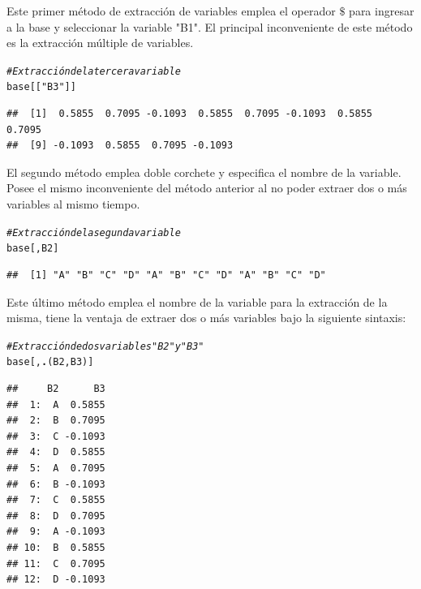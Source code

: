 \documentclass[11pt,a4paper,oneside]{book}\usepackage[]{graphicx}\usepackage[]{color}
\makeatletter
\newcommand{\hlstr}[1]{\textcolor[rgb]{0.192,0.494,0.8}{#1}}%
\newcommand{\hlcom}[1]{\textcolor[rgb]{0.678,0.584,0.686}{\textit{#1}}}%
\newcommand{\hlstd}[1]{\textcolor[rgb]{0.345,0.345,0.345}{#1}}%
\newcommand{\hlkwd}[1]{\textcolor[rgb]{0.737,0.353,0.396}{\textbf{#1}}}%
\newenvironment{kframe}{%
 \def\at@end@of@kframe{}%
 \ifinner\ifhmode%
  \def\at@end@of@kframe{\end{minipage}}%
  \begin{minipage}{\columnwidth}%
 \fi\fi%
 \def\FrameCommand##1{\hskip\@totalleftmargin \hskip-\fboxsep
 \colorbox{shadecolor}{##1}\hskip-\fboxsep
     \hskip-\linewidth \hskip-\@totalleftmargin \hskip\columnwidth}%
 \MakeFramed {\advance\hsize-\width
   \@totalleftmargin\z@ \linewidth\hsize
   \@setminipage}}%
 {\par\unskip\endMakeFramed%
 \at@end@of@kframe}
\newenvironment{knitrout}{}{} %
\makeatother
\begin{document}
\begin{itemize}
Este primer método de extracción de variables emplea el operador $\$$ para ingresar a la base y seleccionar la variable "B1". El principal inconveniente de este método es la extracción múltiple de variables.

\begin{knitrout}
\color{fgcolor}\begin{kframe}
\begin{alltt}
\hlcom{# Extracción de la tercera variable}
\hlstd{base[[}\hlstr{"B3"}\hlstd{]]}
\end{alltt}
\begin{verbatim}
##  [1]  0.5855  0.7095 -0.1093  0.5855  0.7095 -0.1093  0.5855  0.7095
##  [9] -0.1093  0.5855  0.7095 -0.1093
\end{verbatim}
\end{kframe}
\end{knitrout}

El segundo método emplea doble corchete y especifica el nombre de la variable. Posee el mismo inconveniente del método anterior al no poder extraer dos o más variables al mismo tiempo.

\begin{knitrout}
\color{fgcolor}\begin{kframe}
\begin{alltt}
\hlcom{# Extracción de la segunda variable}
\hlstd{base[,B2]}
\end{alltt}
\begin{verbatim}
##  [1] "A" "B" "C" "D" "A" "B" "C" "D" "A" "B" "C" "D"
\end{verbatim}
\end{kframe}
\end{knitrout}

Este último método emplea el nombre de la variable para la extracción de la misma, tiene la ventaja de extraer dos o más variables bajo la siguiente sintaxis:

\begin{knitrout}
\color{fgcolor}\begin{kframe}
\begin{alltt}
\hlcom{# Extracción de dos variables "B2" y "B3"}
\hlstd{base[,}\hlkwd{.}\hlstd{(B2,B3)]}
\end{alltt}
\begin{verbatim}
##     B2      B3
##  1:  A  0.5855
##  2:  B  0.7095
##  3:  C -0.1093
##  4:  D  0.5855
##  5:  A  0.7095
##  6:  B -0.1093
##  7:  C  0.5855
##  8:  D  0.7095
##  9:  A -0.1093
## 10:  B  0.5855
## 11:  C  0.7095
## 12:  D -0.1093
\end{verbatim}
\end{kframe}
\end{knitrout}


\end{itemize}
\end{document}
